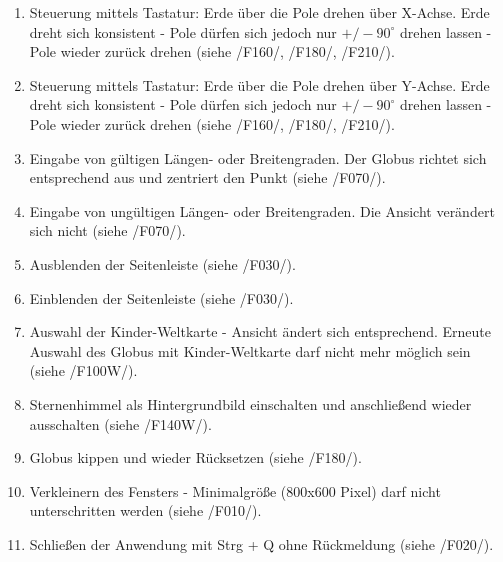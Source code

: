\documentclass[10pt]{scrreprt}
\newcommand{\ziel}[1]{{\fontsize{9.5}{11}\textsf{/#1/}}}
\newcommand{\ziellabel}{Z}
\newcommand{\muss}{\renewcommand{\labelenumi}{\textbf{\ziel{\ziellabel\numprint{\theenumi}0}}}}
\newcommand{\wunsch}{\renewcommand{\labelenumi}{\textbf{\ziel{\ziellabel\numprint{\theenumi}0W}}}}
\begin{document}
\begin{enumerate}[leftmargin = 2.2cm, resume]
\item Steuerung mittels Tastatur: Erde über die Pole drehen über X-Achse. Erde dreht sich konsistent - Pole dürfen sich jedoch nur $+/- 90^\circ$ drehen lassen - Pole wieder zurück drehen (siehe \ziel{F160}, \ziel{F180}, \ziel{F210}).
\item Steuerung mittels Tastatur: Erde über die Pole drehen über Y-Achse. Erde dreht sich konsistent - Pole dürfen sich jedoch nur $+/- 90^\circ$ drehen lassen - Pole wieder zurück drehen (siehe \ziel{F160}, \ziel{F180}, \ziel{F210}).
\item Eingabe von gültigen Längen- oder Breitengraden. Der Globus richtet sich entsprechend aus und zentriert den Punkt (siehe \ziel{F070}).
\item Eingabe von ungültigen Längen- oder Breitengraden. Die Ansicht verändert sich nicht (siehe \ziel{F070}).
\item Ausblenden der Seitenleiste (siehe \ziel{F030}).
\item Einblenden der Seitenleiste (siehe \ziel{F030}).
\wunsch
\item Auswahl der Kinder-Weltkarte - Ansicht ändert sich entsprechend. Erneute Auswahl des Globus mit Kinder-Weltkarte darf nicht mehr möglich sein (siehe \ziel{F100W}).
\item Sternenhimmel als Hintergrundbild einschalten und anschließend wieder ausschalten (siehe \ziel{F140W}).
\muss
\item Globus kippen und wieder Rücksetzen (siehe \ziel{F180}).
\item Verkleinern des Fensters - Minimalgröße (800x600 Pixel) darf nicht unterschritten werden (siehe \ziel{F010}).
\item Schließen der Anwendung mit Strg + Q ohne Rückmeldung (siehe \ziel{F020}).
\end{enumerate}
\end{document}
